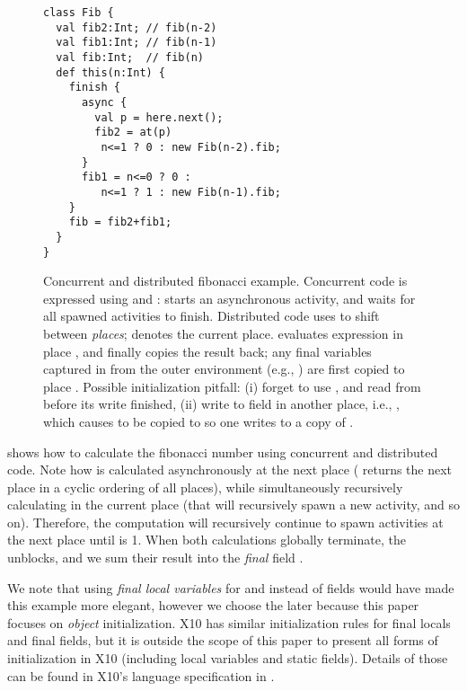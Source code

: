 \begin{figure}
\begin{lstlisting}
class Fib {
  val fib2:Int; // fib(n-2)
  val fib1:Int; // fib(n-1)
  val fib:Int;  // fib(n)
  def this(n:Int) {
    finish {
      async {
        val p = here.next();
        fib2 = at(p)
         n<=1 ? 0 : new Fib(n-2).fib;
      }
      fib1 = n<=0 ? 0 :
         n<=1 ? 1 : new Fib(n-1).fib;
    }
    fib = fib2+fib1;
  }
}
\end{lstlisting}
\caption{Concurrent and distributed fibonacci example.
    Concurrent code is expressed using  and :
         starts an asynchronous activity,
        and  waits for all spawned activities to finish.
    Distributed code uses  to shift between
        \emph{places};
         denotes the current place.
     evaluates expression 
        in place , and finally copies the result back;
        any final variables captured in  from
        the outer environment (e.g., )
        are first copied to place .
    Possible initialization pitfall:
        (i) %
            forget to use ,
            and read from  before its write finished,
        (ii) %
            write to field  in another place, i.e.,
            ,
            which causes \this to be copied to 
            so one writes to a copy of \this.
    }
\label{Figure:DistributedFib}
\end{figure}

 shows how to calculate the fibonacci number 
    using concurrent and distributed code.
Note how  is calculated asynchronously at the next place ( returns the next place in a cyclic ordering of all places),
    while simultaneously recursively calculating  in the current place (that will recursively spawn a new activity, and so on).
Therefore, the computation will recursively continue to spawn activities at the next place until  is 1.
When both calculations globally terminate, the  unblocks,
    and we sum their result into the \emph{final} field .

We note that using \emph{final local variables} for  and  instead of fields
    would have made this example
    more elegant, however we choose the later because this paper focuses on \emph{object} initialization.
X10 has similar initialization rules for final locals and final fields,
    but it is outside the scope of this paper to present all forms of initialization in X10
    (including local variables and static fields).
Details of those can be found in X10's language specification in .

